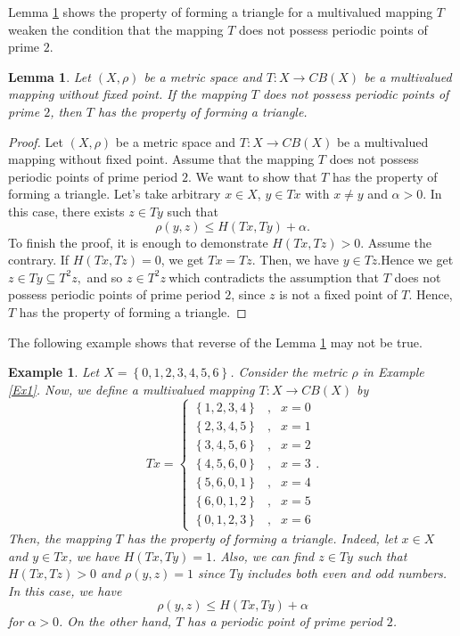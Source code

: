 \documentclass[reqno,11pt]{amsart}
\theoremstyle{plain}
\newtheorem{example}{Example}
\newtheorem{lemma}{Lemma}
\numberwithin{equation}{section}
\begin{document}
Lemma \ref{L1} shows the property of forming a triangle for a multivalued
mapping $T$ weaken the condition that the mapping $T$ does not possess
periodic points of prime $2$.

\begin{lemma}
\label{L1}Let $\left( X,\rho \right) $ be a metric space and $T:X\rightarrow
CB(X)$ be a multivalued mapping without fixed point. If the mapping $T$ does
not possess periodic points of prime $2$, then $T$ has the property of
forming a triangle.
\end{lemma}

\begin{proof}
Let $\left( X,\rho \right) $ be a metric space and $T:X\rightarrow CB(X)$ be
a multivalued mapping without fixed point. Assume that the mapping $T$ does
not possess periodic points of prime period $2$. We want to show that $T$
has the property of forming a triangle. Let's take arbitrary $x\in X$, $y\in
Tx$ with $x\neq y$ and $\alpha >0$. In this case, there exists $z\in Ty$
such that%
\begin{equation*}
\rho (y,z)\leq H(Tx,Ty)+\alpha .
\end{equation*}%
To finish the proof, it is enough to demonstrate $H(Tx,Tz)>0$. Assume the
contrary. If $H(Tx,Tz)=0$, we get $Tx=Tz$. Then, we have $y\in Tz.$Hence we
get $z\in Ty\subseteq T^{2}z,$ and so $z\in T^{2}z~$which contradicts the
assumption that $T$ does not possess periodic points of prime period $2$,
since $z$ is not a fixed point of $T$. Hence, $T$ has the property of
forming a triangle.
\end{proof}

The following example shows that reverse of the Lemma \ref{L1} may not be
true.

\begin{example}
Let $X=\left \{ 0,1,2,3,4,5,6\right \} $. Consider the metric $\rho $ in
Example \ref{Ex1}. Now, we define a multivalued mapping $T:X\rightarrow
CB(X) $ by 
\begin{equation*}
Tx=\left \{ 
\begin{array}{ccc}
\left \{ 1,2,3,4\right \} & , & x=0 \\ 
\left \{ 2,3,4,5\right \} & , & x=1 \\ 
\left \{ 3,4,5,6\right \} & , & x=2 \\ 
\left \{ 4,5,6,0\right \} & , & x=3 \\ 
\left \{ 5,6,0,1\right \} & , & x=4 \\ 
\left \{ 6,0,1,2\right \} & , & x=5 \\ 
\left \{ 0,1,2,3\right \} & , & x=6%
\end{array}%
\right. .
\end{equation*}%
Then, the mapping $T$ has the property of forming a triangle. Indeed, let $%
x\in X$ and $y\in Tx$, we have $H\left( Tx,Ty\right) =1$. Also, we can find $%
z\in Ty$ such that $H(Tx,Tz)>0$ and $\rho (y,z)=1$ since $Ty$ includes both
even and odd numbers. In this case, we have 
\begin{equation*}
\rho (y,z)\leq H(Tx,Ty)+\alpha
\end{equation*}%
for $\alpha >0$. On the other hand, $T$ has a periodic point of prime period 
$2$.
\end{example}
\end{document}
